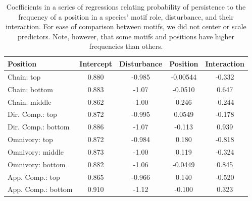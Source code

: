 \documentclass[12pt]{article}
\begin{document}
\begin{spacing}{2.0}
    \begin{table}[h!]
        \caption{Coefficients in a series of regressions relating probability of persistence to the frequency of a position in a species' motif role, disturbance, and their interaction. For ease of comparison between motifs, we did not center or scale predictors. Note, however, that some motifs and positions have higher frequencies than others.}
        \label{tab:persistence_vs_positions}
        \centering
        \begin{tabular}{l | c c c c}
        Position    & Intercept & Disturbance   & Position  & Interaction \\
        \hline
        Chain: top  & 0.880 &   -0.985 & -0.00544 & -0.332 \\
        Chain: bottom   & 0.883 &   -1.07 & -0.0510 &   0.647 \\
        Chain: middle   & 0.862 & -1.00 &   0.246 & -0.244 \\
        \hline
        Dir. Comp.: top & 0.872 &   -0.995  & 0.0549 &  -0.178 \\
        Dir. Comp.: bottom & 0.886 &    -1.07 & -0.113 &    0.939 \\
        \hline
        Omnivory: top   & 0.872 &   -0.984 &    0.180 & -0.818 \\
        Omnivory: middle & 0.873 & -1.00 &  0.119 & -0.324 \\
        Omnivory: bottom & 0.882 & -1.06 &  -0.0449 &   0.845 \\
        \hline
        App. Comp.: top & 0.865 &   -0.966 &    0.140 & -0.520 \\
        App. Comp.: bottom & 0.910 &    -1.12 & -0.100 &    0.323 \\
        \hline
        \end{tabular}
    \end{table}



\end{spacing}
\end{document}
